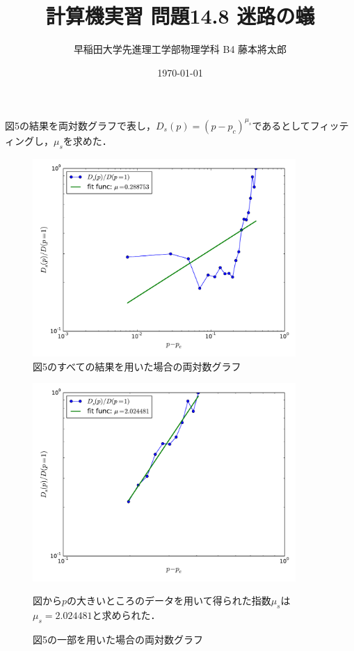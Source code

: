 \documentclass{jsarticle}
\title{計算機実習 問題14.8 迷路の蟻}
\author{早稲田大学先進理工学部物理学科 B4 藤本將太郎}
\date{\today}
\begin{document}
    図5の結果を両対数グラフで表し，$D_{s}(p)=(p-p_{c})^{\mu_{s}}$であるとしてフィッティングし，$\mu_{s}$を求めた．
    \begin{figure}[H]
        \begin{center}
            \includegraphics[width=10.0cm]{figure_8.pdf}
            \caption{図5のすべての結果を用いた場合の両対数グラフ}
        \end{center}

    \end{figure}

    \begin{figure}[H]
        \begin{center}
            \includegraphics[width=10.0cm]{figure_9.pdf}
            \caption{図5の一部を用いた場合の両対数グラフ}
        \end{center}
        図から$p$の大きいところのデータを用いて得られた指数$\mu_{s}$は$\mu_{s}=2.024481$と求められた．
    \end{figure}
        


%
\end{document}
